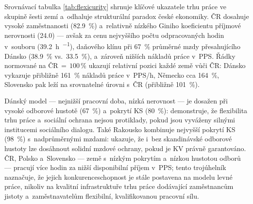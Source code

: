 Srovnávací tabulka \ref{tab:flexicurity} shrnuje klíčové ukazatele trhu práce ve skupině šesti zemí a~odhaluje strukturální paradox české ekonomiky.
ČR dosahuje vysoké zaměstnanosti (\SI{82,9}{\percent}) a~relativně nízkého Giniho koeficientu příjmové nerovnosti (\SI{24,0}{}) --- avšak za cenu nejvyššího počtu odpracovaných hodin v~souboru (\SI{39,2}{\hour\per\week}), daňového klínu při \SI{67}{\percent} průměrné mzdy přesahujícího Dánsko (\SI{38,9}{\percent} vs.~\SI{33,5}{\percent}), a~zároveň nižších nákladů práce v~\ac{PPS}.
Řádky normované na \(\text{ČR}\,{=}\,100\,\%\) ukazují relativní pozici každé země vůči ČR: Dánsko vykazuje přibližně \SI{161}{\percent} nákladů práce v~\ac{PPS}/h, Německo cca \SI{164}{\percent}, Slovensko pak leží na srovnatelné úrovni s~ČR (přibližně \SI{101}{\percent}).

Dánský model --- nejnižší pracovní doba, nízká nerovnost --- je dosažen při vysoké odborové hustotě (\SI{67}{\percent}) a~pokrytí \ac{KS} (\SI{80}{\percent}): demonstruje, že flexibilita trhu práce a~sociální ochrana nejsou protiklady, pokud jsou vyváženy silnými institucemi sociálního dialogu.
Také Rakousko kombinuje nejvyšší pokrytí \ac{KS} (\SI{98}{\percent}) s~nadprůměrnými mzdami: ukazuje, že i~bez skandinávské odborové hustoty lze dosáhnout solidní mzdové ochrany, pokud je \ac{KV} právně garantováno.
ČR, Polsko a~Slovensko --- země s~nízkým pokrytím a~nízkou hustotou odborů --- pracují více hodin za nižší disponibilní příjem v~\ac{PPS}; tento trojúhelník naznačuje, že jejich konkurenceschopnost je stále postavena na modelu levné práce, nikoliv na kvalitní infrastruktuře trhu práce dodávající zaměstnancům jistoty a~zaměstnavatelům flexibilní, kvalifikovanou pracovní sílu.


